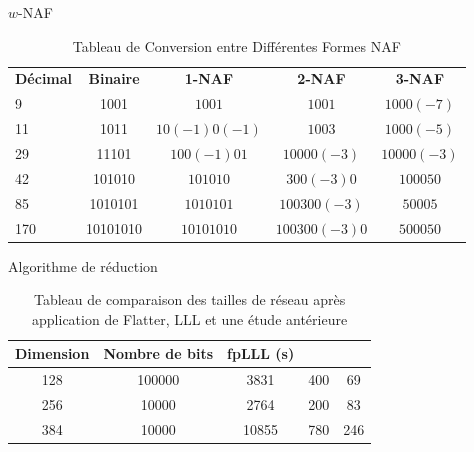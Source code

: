 \documentclass{backend/backend}
\begin{document}
\begin{frame}{$w$-NAF}
    \begin{center}
    \begin{table}[htbp]
        \caption{Tableau de Conversion entre Différentes Formes NAF}
        \label{tab:comparaison_NAF}
        \centering
        \begin{tabular}{|l|cccc|}
            \toprule
            \textbf{Décimal} & \textbf{Binaire} & \textbf{1-NAF} & \textbf{2-NAF} & \textbf{3-NAF} \\
            9 & 1001 & $1001$ & $1 0 0 1$ & $1 0 0 0 (-7)$ \\
            11 & 1011 & $1 0 (-1) 0 (-1)$ & $1 0 0 3$ & $1 0 0 0 (-5)$ \\
            29 & 11101 & $1 0 0 (-1) 0 1$ & $1 0 0 0 0 (-3)$ & $1 0 0 0 0 (-3)$ \\
            42 & 101010 & $101010$ & $3 0 0 (-3) 0$ & $1 0 0 0 5 0$\\
            85 & 1010101 & $1010101$ & $1 0 0 3 0 0 (-3)$ & $5 0 0 0 5$ \\
            170 & 10101010 & $10101010$ & $1 0 0 3 0 0 (-3) 0$ & $5 0 0 0 5 0$ \\
            \hline
        \end{tabular}
    \end{table}
\end{center}
\end{frame}

\begin{frame}{Algorithme de réduction}
    \begin{center}
    \begin{table}[H]
        \caption{Tableau de comparaison des tailles de réseau après application de Flatter, LLL et une étude antérieure}
        \label{tab:flatter}
        \centering
        \begin{tabular}{|c|c|c|c|c|}
        \hline
        \textbf{Dimension} & \textbf{Nombre de bits} & \textbf{fpLLL (s)} & \textbf{\cite{ref32}} & \textbf{\cite{flatter}} \\
        \hline
        128 & 100000 & 3831 & 400 & 69 \\
        \hline
        256 & 10000 & 2764 & 200 & 83 \\
        \hline
        384 & 10000 & 10855 & 780 & 246 \\
        \hline
        \end{tabular}
    \end{table}
\end{center}
\end{frame}
\end{document}
